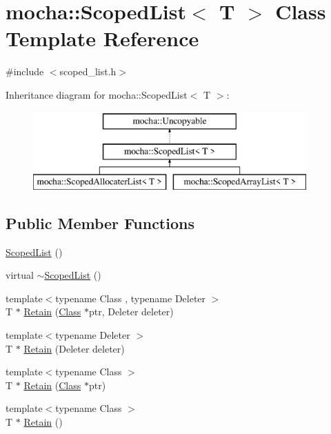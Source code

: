 \hypertarget{classmocha_1_1_scoped_list}{
\section{mocha::ScopedList$<$ T $>$ Class Template Reference}
\label{classmocha_1_1_scoped_list}
}


{\ttfamily \#include $<$scoped\_\-list.h$>$}

Inheritance diagram for mocha::ScopedList$<$ T $>$:\begin{figure}[H]
\begin{center}
\leavevmode
\includegraphics[height=3.000000cm]{classmocha_1_1_scoped_list}
\end{center}
\end{figure}
\subsection*{Public Member Functions}
\begin{DoxyCompactItemize}
\item 
\hyperlink{classmocha_1_1_scoped_list_a1fd9146260b328e3128f5fc4a24520c0}{ScopedList} ()
\item 
virtual \hyperlink{classmocha_1_1_scoped_list_abd4cd67e3e40d02a33890cb44e4b721d}{$\sim$ScopedList} ()
\item 
{\footnotesize template$<$typename Class , typename Deleter $>$ }\\T $\ast$ \hyperlink{classmocha_1_1_scoped_list_a61bbbf95172fb61fa808d9fa7482f730}{Retain} (\hyperlink{classmocha_1_1_class}{Class} $\ast$ptr, Deleter deleter)
\item 
{\footnotesize template$<$typename Deleter $>$ }\\T $\ast$ \hyperlink{classmocha_1_1_scoped_list_a785f1500b54cfed3e420f97512d73df1}{Retain} (Deleter deleter)
\item 
{\footnotesize template$<$typename Class $>$ }\\T $\ast$ \hyperlink{classmocha_1_1_scoped_list_ade60ad28ed6411369c882eeec21def9d}{Retain} (\hyperlink{classmocha_1_1_class}{Class} $\ast$ptr)
\item 
{\footnotesize template$<$typename Class $>$ }\\T $\ast$ \hyperlink{classmocha_1_1_scoped_list_ab2b21b48525ed825bcab6acaef93ece2}{Retain} ()
\end{DoxyCompactItemize}
